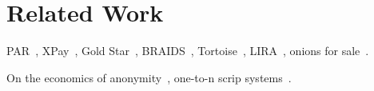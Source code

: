 \section{Related Work} \label{rel}

PAR~\cite{raykova-pet2008}, XPay~\cite{wpes09-xpay}, Gold Star~\cite{incentives-fc10}, BRAIDS~\cite{ccs10-braids}, Tortoise~\cite{acsac11-tortoise}, LIRA~\cite{jansen2013lira}, onions for sale~\cite{johnson2013onions}.

On the economics of anonymity~\cite{Acquisti03onthe}, one-to-n scrip systems~\cite{humbert2011-scrip}.